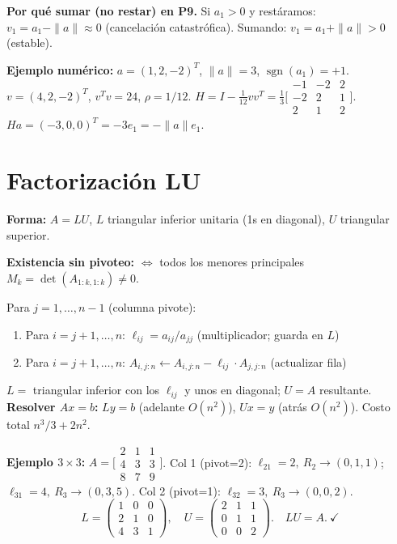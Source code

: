 \documentclass[12pt,a4paper]{article}
\begin{document}
\textbf{Por qué sumar (no restar) en P9.}
Si $a_1>0$ y restáramos: $v_1=a_1-\|a\|\approx0$ (cancelación catastrófica).
Sumando: $v_1=a_1+\|a\|>0$ (estable).

\textbf{Ejemplo numérico:} $a=(1,2,-2)^T$, $\|a\|=3$, $\operatorname{sgn}(a_1)=+1$.
$v=(4,2,-2)^T$, $v^Tv=24$, $\rho=1/12$.
$H=I-\tfrac{1}{12}vv^T=\tfrac{1}{3}\bigl[\begin{smallmatrix}-1&-2&2\\-2&2&1\\2&1&2\end{smallmatrix}\bigr]$.
$Ha=(-3,0,0)^T=-3e_1=-\|a\|e_1$. \checkmark

\section{Factorización LU}

\textbf{Forma:} $A=LU$, $L$ triangular inferior unitaria (1s en diagonal), $U$ triangular superior.

\textbf{Existencia sin pivoteo:} $\Leftrightarrow$ todos los menores principales $M_k=\det(A_{1:k,1:k})\ne0$.

\begin{algoritmo}[title={Eliminación Gaussiana: $A=LU$}]
Para $j=1,\ldots,n-1$ (columna pivote):
\begin{enumerate}[noitemsep]
  \item Para $i=j+1,\ldots,n$: $\ell_{ij}=a_{ij}/a_{jj}$ \quad(multiplicador; guarda en $L$)
  \item Para $i=j+1,\ldots,n$: $A_{i,j:n}\leftarrow A_{i,j:n}-\ell_{ij}\cdot A_{j,j:n}$ \quad(actualizar fila)
\end{enumerate}
$L=$ triangular inferior con los $\ell_{ij}$ y unos en diagonal; $U=A$ resultante.\\
\textbf{Resolver $Ax=b$:} $Ly=b$ (adelante $O(n^2)$), $Ux=y$ (atrás $O(n^2)$). Costo total $n^3/3+2n^2$.
\end{algoritmo}

\textbf{Ejemplo $3\times3$:} $A=\bigl[\begin{smallmatrix}2&1&1\\4&3&3\\8&7&9\end{smallmatrix}\bigr]$.
Col 1 (pivot=2): $\ell_{21}=2,\ R_2\to(0,1,1)$;\ $\ell_{31}=4,\ R_3\to(0,3,5)$.
Col 2 (pivot=1): $\ell_{32}=3,\ R_3\to(0,0,2)$.
\[
  L=\begin{pmatrix}1&0&0\\2&1&0\\4&3&1\end{pmatrix},\quad U=\begin{pmatrix}2&1&1\\0&1&1\\0&0&2\end{pmatrix}.\quad LU=A.\ \checkmark
\]
\end{document}
